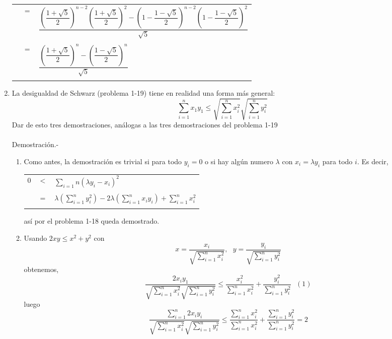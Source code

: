 \begin{enumerate}[\bfseries 1.]
\begin{center}
\begin{tabular}{rcl}
		  & $=$ & $\dfrac{\left( \dfrac{1+\sqrt{5}}{2} \right)^{n-2} \left( \dfrac{1+\sqrt{5}}{2}\right)^2 - \left( 1 - \dfrac{1-\sqrt{5}}{2} \right)^{n-2} \left( 1 - \dfrac{1-\sqrt{5}}{2} \right)^2}{\sqrt{5}}$\\\\
	       & $=$ & $\dfrac{\left( \dfrac{1+\sqrt{5}}{2} \right)^n - \left( \dfrac{1-\sqrt{5}}{2} \right)^n}{\sqrt{5}}$\\\\
	 \end{tabular}
      \end{center}

   \item La desigualdad de Schwarz (problema 1-19) tiene en realidad una forma más general: $$\displaystyle\sum_{i=1}^n x_1 y_1 \leq \sqrt{\sum_{i=1}^n x_i^2} \sqrt{\sum_{i=1}^n y_i^2}$$
      Dar de esto tres demostraciones, análogas a las tres demostraciones del problema 1-19\\\\
      Demostración.-\; 
      \begin{enumerate}[\bfseries i)]
	 \item Como antes, la demostración es trivial si para todo $y_i=0$ o si hay algún numero $\lambda$ con $x_i=\lambda y_i$ para todo $i$. Es decir, 
	    \begin{center} 
	       \begin{tabular}{rcl}
		  $0$ & $<$ & $\sum\limits_{i=1}n (\lambda y_i - x_i)^2$\\\\
		   & $=$ & $\lambda \left( \sum\limits_{i=1}^n y_i^2 \right) -2 \lambda \left( \sum\limits_{i=1}^n x_i y_i\right) + \sum\limits_{i=1}^n x_i^2$\\\\
	       \end{tabular}
	       así por el problema 1-18 queda demostrado. 
	    \end{center}
	 \item Usando $2xy \leq x^2 + y^2$ con 
            $$x=\dfrac{x_i}{\sqrt{\sum\limits_{i=1}^n x_i^2}}, \,\,\,\, y=\dfrac{y_i}{\sqrt{\sum\limits_{i=1}^n y_i^2}}$$
            obtenemos, 
            $$\dfrac{2x_iy_1}{\sqrt{\sum\limits_{i=1}^n x_i^2} \sqrt{\sum\limits_{i=1}^n y_i^2}} \leq \dfrac{x_i^2}{\sum\limits_{i=1}^n x_i^2} + \dfrac{y_i^2}{\sum\limits_{i=1}^n y_i^2} \,\,\,\, (1)$$
            luego
            $$\dfrac{\sum\limits_{i=1}^n 2x_iy_i}{\sqrt{\sum\limits_{i=1}^n x_i^2} \sqrt{\sum\limits_{i=1}^n y_i^2}} \leq \dfrac{\sum\limits_{i=1}^n x_i^2}{\sum\limits_{i=1}^n x_i^2} + \dfrac{\sum\limits_{i=1}^n y_i^2}{\sum\limits_{i=1}^n y_i^2}=2$$

\end{enumerate}
\end{enumerate}
